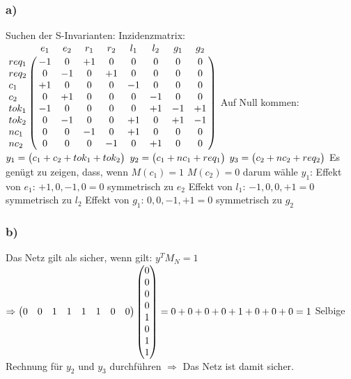 \documentclass[12pt]{scrreprt}
\begin{document}
\subsubsection*{a)}
Suchen der S-Invarianten:\newline
Inzidenzmatrix:\newline
$\bordermatrix{ %
		&e_1&e_2&r_1&r_2&l_1&l_2&g_1&g_2\cr
req_1	& -1&  0& +1&  0&  0&  0&  0&  0\cr
req_2	&  0& -1&  0& +1&  0&  0&  0&  0\cr
c_1		& +1&  0&  0&  0& -1&  0&  0&  0\cr
c_2		&  0& +1&  0&  0&  0& -1&  0&  0\cr
tok_1	& -1&  0&  0&  0&  0& +1& -1& +1\cr
tok_2	&  0& -1&  0&  0& +1&  0& +1& -1\cr
nc_1	&  0&  0& -1&  0& +1&  0&  0&  0\cr
nc_2	&  0&  0&  0& -1&  0& +1&  0&  0\cr
}$\vspace*{1cm}\newline
Auf Null kommen:\newline
$y_1=\begin{pmatrix}
	c_1 + c_2 + tok_1 + tok_2\cr
\end{pmatrix}$\newline
$y_2=\begin{pmatrix}
	c_1 + nc_1 + req_1\cr
\end{pmatrix}$\newline
$y_3=\begin{pmatrix}
	c_2 + nc_2 + req_2\cr
\end{pmatrix}$\newline
Es genügt zu zeigen, dass, wenn $M(c_1)=1$ $M(c_2)=0$\newline
darum wähle $y_1$:\newline
Effekt von $e_1$: $+1, 0, -1, 0 = 0$ symmetrisch zu $e_2$\newline
Effekt von $l_1$: $-1, 0, 0, +1 = 0$ symmetrisch zu $l_2$\newline
Effekt von $g_1$: $0, 0, -1, +1 = 0$ symmetrisch zu $g_2$\newline

\subsubsection*{b)}
Das Netz gilt als sicher, wenn gilt: $y^TM_N = 1$\newline
$\Rightarrow \begin{pmatrix}0 & 0 & 1 & 1 & 1 & 1 & 0 & 0\end{pmatrix}\begin{pmatrix}0\cr 0\cr 0\cr 0\cr 1\cr 0\cr 1\cr 1\cr\end{pmatrix}=0+0+0+0+1+0+0+0 = 1$\newline
Selbige Rechnung für $y_2$ und $y_3$ durchführen\newline
$\Rightarrow$ Das Netz ist damit sicher.
\end{document}
